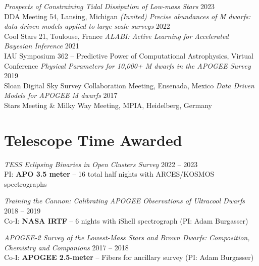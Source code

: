 \documentclass[a4,10.5pt]{article}
\begin{document}
\textit{Prospects of Constraining Tidal Dissipation of Low-mass Stars} \hfill 2023 \\
DDA Meeting 54, Lansing, Michigan  \vspace{.2cm} \newline
\textit{(Invited) Precise abundances of M dwarfs: data driven models applied to large scale surveys} \hfill 2022 \\
Cool Stars 21, Toulouse, France  \vspace{.2cm} \newline
\textit{ALABI: Active Learning for Accelerated Bayesian Inference} \hfill 2021 \\
IAU Symposium 362 -- Predictive Power of Computational Astrophysics, Virtual Conference \vspace{.2cm} \newline
\textit{Physical Parameters for 10,000+ M dwarfs in the APOGEE Survey} \hfill 2019 \\ 
Sloan Digital Sky Survey Collaboration Meeting, Ensenada, Mexico \vspace{.2cm} \newline
\textit{Data Driven Models for APOGEE M dwarfs} \hfill 2017 \\ 
Stars Meeting  \& Milky Way Meeting, MPIA, Heidelberg, Germany


\section{Telescope Time Awarded}

\textsl{TESS Eclipsing Binaries in Open Clusters Survey} \hfill 2022 -- 2023 \\
PI: \textbf{APO 3.5 meter} -- 16 total half nights with ARCES/KOSMOS spectrographs \vspace{.2cm} 

\textsl{Training the Cannon: Calibrating APOGEE Observations of Ultracool Dwarfs} \hfill 2018 -- 2019 \\ 
Co-I: \textbf{NASA IRTF} -- 6 nights with iShell spectrograph (PI: Adam Burgasser) \vspace{.2cm} 

\textsl{APOGEE-2 Survey of the Lowest-Mass Stars and Brown Dwarfs: Composition, Chemistry and Companions} \hfill 2017 -- 2018 \\
Co-I: \textbf{APOGEE 2.5-meter} -- Fibers for ancillary survey (PI: Adam Burgasser) 
\end{document}
